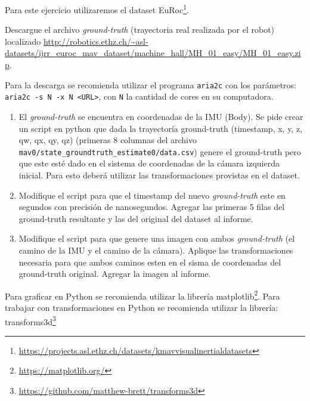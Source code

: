 \documentclass[tp]{lcc}
\begin{document}
\ejercicio Para este ejercicio utilizaremos el dataset EuRoc\footnote{\url{https://projects.asl.ethz.ch/datasets/kmavvisualinertialdatasets}}.

Descargue el archivo \emph{ground-truth} (trayectoria real realizada por el robot) localizado \url{ http://robotics.ethz.ch/~asl-datasets/ijrr_euroc_mav_dataset/machine_hall/MH_01_easy/MH_01_easy.zip}.

\begin{nota}
	Para la descarga se recomienda utilizar el programa \lstinline{aria2c} con los parámetros: \lstinline{aria2c -s N -x N <URL>}, con \lstinline{N} la cantidad de cores en su computadora.
\end{nota}

\begin{enumerate}
    \item El \emph{ground-truth} se encuentra en coordenadas de la IMU (Body). Se pide crear un script en python que dada la trayectoría ground-truth (timestamp, x, y, z, qw, qx, qy, qz) (primeras 8 columnas del archivo \lstinline{mav0/state_groundtruth_estimate0/data.csv}) genere el ground-truth pero que este esté dado en el sistema de coordenadas de la cámara izquierda inicial. Para esto deberá utilizar las transformaciones provistas en el dataset.
    
    \item Modifique el script para que el timestamp del nuevo \emph{ground-truth} este en segundos con precisión de nanosegundos. Agregar las primeras 5 filas del ground-truth resultante y las del original del dataset al informe.
    
    \item Modifique el script para que genere una imagen con ambos \emph{ground-truth} (el camino de la IMU y el camino de la cámara). Aplique las transformaciones necesaria para que ambos caminos esten en el sisma de coordenadas del ground-truth original. Agregar la imagen al informe.
\end{enumerate}

\begin{nota}
	Para graficar en Python se recomienda utilizar la librería matplotlib\footnote{\url{https://matplotlib.org/}}. Para trabajar con transformaciones en Python se recomienda utilizar la librería: transforms3d\footnote{\url{https://github.com/matthew-brett/transforms3d}}
\end{nota}
\end{document}
